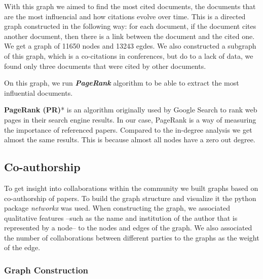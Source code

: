 \documentclass[article,twocolumn]{IEEEtran}
\begin{document}
With this graph we aimed to find the most cited documents, the documents
that are the most influencial and how citations evolve over time. This
is a directed graph constructed in the following way: for each document,
if the document cites another document, then there is a link between the
document and the cited one. We get a graph of 11650 nodes and 13243
egdes. We also constructed a subgraph of this graph, which is a
co-citations in conferences, but do to a lack of data, we found only
three documents that were cited by other documents.

On this graph, we run \textbf{\emph{PageRank}} algorithm to be able to
extract the most influential documents.

\textbf{PageRank (PR)}* is an algorithm originally used by Google Search
to rank web pages in their search engine results. In our case, PageRank
is a way of measuring the importance of referenced papers. Compared to
the in-degree analysis we get almost the same results. This is because
almost all nodes have a zero out degree.



    \hypertarget{co-authorship}{%
\subsection{Co-authorship}\label{co-authorship}}

To get insight into collaborations within the community we built graphs
based on co-authorship of papers. To build the graph structure and
visualize it the python package \emph{networkx} was used. When
constructing the graph, we associated qualitative features --such as the
name and institution of the author that is represented by a node-- to
the nodes and edges of the graph. We also associated the number of
collaborations between different parties to the graphs as the weight of
the edge.

\hypertarget{graph-construction}{%
\subsubsection{Graph Construction}\label{graph-construction}}
\end{document}

